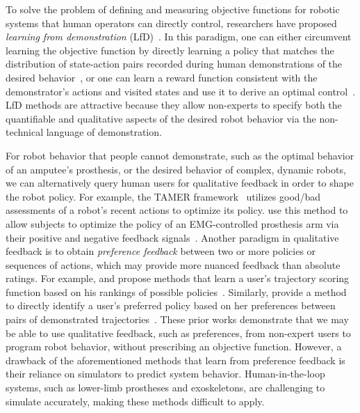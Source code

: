 To solve the problem of defining and measuring objective functions for robotic
systems that human operators can directly control, researchers have proposed
\emph{learning from demonstration} (LfD)~\citep{argall2009survey}. In this
paradigm, one can either circumvent learning the objective function by directly
learning a policy that matches the distribution of state-action pairs recorded
during human demonstrations of the desired
behavior~\citep{pomerleau1991efficient, schaal1999imitation}, or one can learn a
reward function consistent with the demonstrator's actions and visited states
and use it to derive an optimal control~\citep{ng2000algorithms,
ratliff2006maximum, ziebart2009human}. LfD methods are attractive because they
allow non-experts to specify both the quantifiable and qualitative aspects of
the desired robot behavior via the non-technical language of demonstration.

For robot behavior that people cannot demonstrate, such as the optimal behavior
of an amputee's prosthesis, or the desired behavior of complex, dynamic robots,
we can alternatively query human users for qualitative feedback in order to
shape the robot policy. For example, the TAMER
framework~\citep{knox2009interactively, knox2013training} utilizes good/bad
assessments of a robot's recent actions to optimize its policy.
\citeauthor{pilarski2011online} use this method to allow subjects to optimize
the policy of an EMG-controlled prosthesis arm via their positive and negative
feedback signals~\citep{pilarski2011online}.  Another paradigm in qualitative
feedback is to obtain \emph{preference feedback} between two or more policies or
sequences of actions, which may provide more nuanced feedback than absolute
ratings. For example, \citeauthor{jain2013learning} and
\citeauthor{akrour2014programming} propose methods that learn a user's
trajectory scoring function based on his rankings of possible
policies~\citep{jain2013learning, akrour2014programming}. Similarly,
\citeauthor{wilson2012bayesian} provide a method to directly identify a user's
preferred policy based on her preferences between pairs of demonstrated
trajectories~\citep{wilson2012bayesian}. These prior works demonstrate that we
may be able to use qualitative feedback, such as preferences, from non-expert
users to program robot behavior, without prescribing an objective function.
However, a drawback of the aforementioned methods that learn from preference
feedback is their reliance on simulators to predict system behavior.
Human-in-the-loop systems, such as lower-limb prostheses and exoskeletons, are
challenging to simulate accurately, making these methods difficult to apply.


